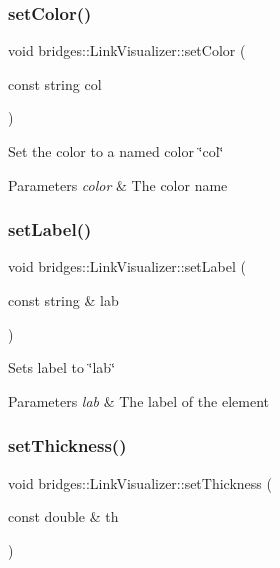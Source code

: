 \subsubsection{\texorpdfstring{setColor()}{setColor()}\hspace{0.1cm}{\footnotesize\ttfamily [2/2]}}
{\footnotesize\ttfamily void bridges\+::\+Link\+Visualizer\+::set\+Color (\begin{DoxyParamCaption}\item[{const string}]{col }\end{DoxyParamCaption})\hspace{0.3cm}{\ttfamily [inline]}}

Set the color to a named color \char`\"{}col\char`\"{} 
\begin{DoxyParams}{Parameters}
{\em color} & The color name \\
\hline
\end{DoxyParams}
\mbox{\label{classbridges_1_1_link_visualizer_a7e590ad57c51ef16a1d46e05ffdf1fb3}} 
\subsubsection{\texorpdfstring{setLabel()}{setLabel()}}
{\footnotesize\ttfamily void bridges\+::\+Link\+Visualizer\+::set\+Label (\begin{DoxyParamCaption}\item[{const string \&}]{lab }\end{DoxyParamCaption})\hspace{0.3cm}{\ttfamily [inline]}}

Sets label to \char`\"{}lab\char`\"{}


\begin{DoxyParams}{Parameters}
{\em lab} & The label of the element \\
\hline
\end{DoxyParams}
\mbox{\label{classbridges_1_1_link_visualizer_a92a88e0e4c2f0c8c68f33578743c6502}} 
\subsubsection{\texorpdfstring{setThickness()}{setThickness()}}
{\footnotesize\ttfamily void bridges\+::\+Link\+Visualizer\+::set\+Thickness (\begin{DoxyParamCaption}\item[{const double \&}]{th }\end{DoxyParamCaption})\hspace{0.3cm}{\ttfamily [inline]}}

